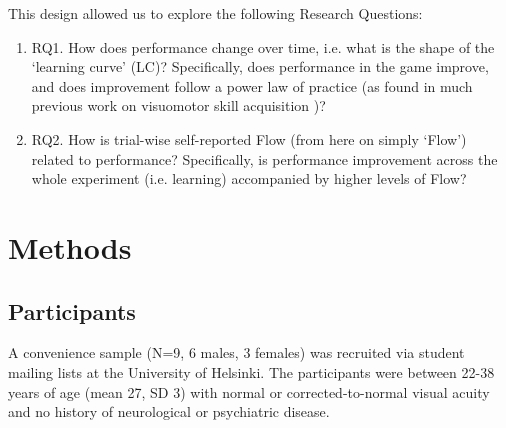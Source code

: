 \documentclass{frontierstyle/frontiersSCNS}
\begin{document}
This design allowed us to explore the following Research Questions:
\begin{enumerate}
	\item RQ1. How does performance change over time, i.e. what is the shape of the `learning curve' (LC)? Specifically, does performance in the game improve, and does improvement follow a power law of practice (as found in much previous work on visuomotor skill acquisition \citep{Newell1982})?

	\item RQ2. How is trial-wise self-reported Flow (from here on simply `Flow') related to performance? Specifically, is performance improvement across the whole experiment (i.e. learning) accompanied by higher levels of Flow?

\end{enumerate}


\section{Methods}

\subsection{Participants}
A convenience sample (N=9, 6 males, 3 females) was recruited via student mailing lists at the University of Helsinki. The participants were between 22-38 years of age (mean 27, SD 3) with normal or corrected-to-normal visual acuity and no history of neurological or psychiatric disease.
\end{document}
